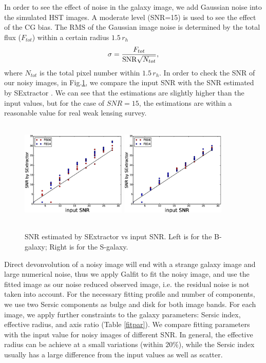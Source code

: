 \documentclass[useAMS,usenatbib]{mn2e}
\newcommand{\be}{\begin{equation}}
\newcommand{\ee}{\end{equation}}
\begin{document}
In order to see the effect of noise in the galaxy image, we add
Gaussian noise into the simulated HST images. A moderate level (SNR=15) is
used to see the effect of the CG bias. The RMS of the Gaussian image noise
is determined by the total flux ($F_{tot}$) within a certain radius $1.5\,r_h$
%
\be
\sigma = {F_{tot} \over {\rm SNR} \sqrt{N_{tot}} },
\ee
%
where $N_{tot}$ is the total pixel number within $1.5\,r_h$. In order
to check the SNR of our noisy images, in Fig.\ref{fig:ests2n}, we
compare the input SNR with the SNR estimated by SExtractor
\citep{1996A&AS..117..393B}. We can see that the estimations are
slightly higher than the input values, but for the case of $SNR=15$,
the estimations are within a reasonable value for real weak lensing
survey.
%
\begin{figure}
\centerline{\includegraphics[height=5cm,width=5.0cm]{zs2ncB.eps}
\includegraphics[height=5cm,width=5.0cm]{zs2ncS.eps}}
\caption{SNR estimated by SExtractor vs input SNR. Left is for the
  B-galaxy; Right is for the S-galaxy.}
\label{fig:ests2n}
\end{figure}
%

Direct devonvolution of a noisy image will end with a strange galaxy image
and large numerical noise, thus we apply Galfit
\citep{2010AJ....139.2097P} to fit the noisy image, and use the fitted
image as our noise reduced observed image, i.e. the residual noise is
not taken into account. For the necessary fitting profile and number
of components, we use two Sersic components as bulge and disk for both
image bands. For each image, we apply further constraints to
the galaxy parameters: Sersic index, effective radius, and axis ratio
(Table \ref{fitpar}). We compare fitting parameters with the input
value for noisy images of different SNR. In general, the effective
radius can be achieve at a small variations (within $20\%$), while the
Sersic index usually has a large difference from the input values as
well as scatter.
\end{document}
